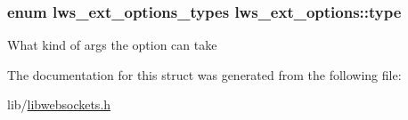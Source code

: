 \subsubsection[{\texorpdfstring{type}{type}}]{\setlength{\rightskip}{0pt plus 5cm}enum {\bf lws\+\_\+ext\+\_\+options\+\_\+types} lws\+\_\+ext\+\_\+options\+::type}\hypertarget{structlws__ext__options_a7c4dbd62dbeba63a9d50d2306bd1cc61}{}\label{structlws__ext__options_a7c4dbd62dbeba63a9d50d2306bd1cc61}
What kind of args the option can take 

The documentation for this struct was generated from the following file\+:\begin{DoxyCompactItemize}
\item 
lib/\hyperlink{libwebsockets_8h}{libwebsockets.\+h}\end{DoxyCompactItemize}
